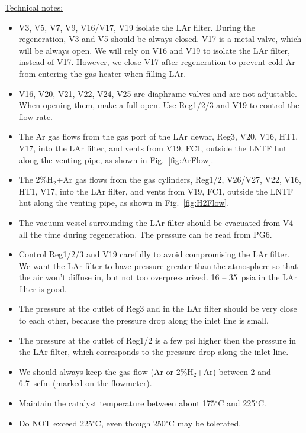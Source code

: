 \documentclass[letterpaper,11pt]{article}
\newcommand{\Hydro}     {H$_2$}
\newcommand{\dC}        {$^\circ$C}
\begin{document}
\underline{Technical notes:}
\begin{itemize}
\setlength\itemsep{-0.2em}
\item V3, V5, V7, V9, V16/V17, V19 isolate the LAr filter.  
During the regeneration, V3 and V5 should be always closed.  
V17 is a metal valve, which will be always open.
We will rely on V16 and V19 to 
isolate the LAr filter, instead of V17.
However, we close V17 after regeneration to prevent cold Ar from entering
the gas heater when filling LAr.
\item V16, V20, V21, V22, V24, V25 are diaphrame valves and are not adjustable.
When opening them, make a full open.
Use Reg1/2/3 and V19 to control the flow rate.
\item The Ar gas flows from the gas port of the LAr dewar, Reg3, V20, V16, HT1, V17, into the LAr filter, 
and vents from V19, FC1, outside the LNTF hut along the venting pipe, as shown in 
Fig.~\ref{fig:ArFlow}.
\item The 2\%{\Hydro}+Ar gas flows from the gas cylinders, Reg1/2, V26/V27, V22, V16, HT1, V17, 
into the LAr filter, 
and vents from V19, FC1, outside the LNTF hut along the venting pipe, 
as shown in Fig.~\ref{fig:H2Flow}.
\item The vacuum vessel surrounding the LAr filter should be evacuated from V4 all the time 
during regeneration.  
The pressure can be read from PG6.
\item Control Reg1/2/3 and V19 carefully to avoid compromising the LAr filter.  
We want the LAr filter to have pressure 
greater than the atmosphere so that the air won't diffuse in, but not too overpressurized.  
16 -- 35~psia in the LAr filter is good.
\item The pressure at the outlet of Reg3 and in the LAr filter should be very close to each other,
because the pressure drop along the inlet line is small.
\item The pressure at the outlet of Reg1/2 is a few psi higher then the pressure in the LAr filter,
which corresponds to the pressure drop along the inlet line. 
\item We should always keep the gas flow (Ar or 2\%{\Hydro}+Ar) between 2 and 6.7~scfm 
(marked on the flowmeter).
\item Maintain the catalyst temperature between about 175{\dC} and 225{\dC}.
\item Do NOT exceed 225{\dC}, even though 250{\dC} may be tolerated.

\end{itemize}
\end{document}
